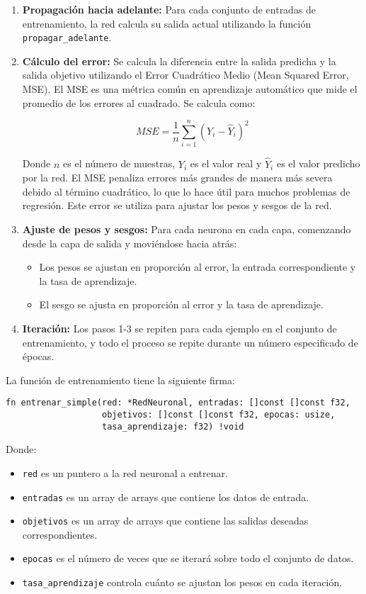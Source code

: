 \documentclass[twocolumn]{article}
\begin{document}
\begin{enumerate}
    \item \textbf{Propagación hacia adelante:} Para cada conjunto de entradas de entrenamiento, la red calcula su salida actual utilizando la función \texttt{propagar\_adelante}.

    \item \textbf{Cálculo del error:} Se calcula la diferencia entre la salida predicha y la salida objetivo utilizando el Error Cuadrático Medio (Mean Squared Error, MSE). El MSE es una métrica común en aprendizaje automático que mide el promedio de los errores al cuadrado. Se calcula como:
    
    \[
    MSE = \frac{1}{n} \sum_{i=1}^n (Y_i - \hat{Y}_i)^2
    \]
    
    Donde $n$ es el número de muestras, $Y_i$ es el valor real y $\hat{Y}_i$ es el valor predicho por la red. El MSE penaliza errores más grandes de manera más severa debido al término cuadrático, lo que lo hace útil para muchos problemas de regresión. Este error se utiliza para ajustar los pesos y sesgos de la red.
    
    \item \textbf{Ajuste de pesos y sesgos:} Para cada neurona en cada capa, comenzando desde la capa de salida y moviéndose hacia atrás:
    \begin{itemize}
        \item Los pesos se ajustan en proporción al error, la entrada correspondiente y la tasa de aprendizaje.
        \item El sesgo se ajusta en proporción al error y la tasa de aprendizaje.
    \end{itemize}

    \item \textbf{Iteración:} Los pasos 1-3 se repiten para cada ejemplo en el conjunto de entrenamiento, y todo el proceso se repite durante un número especificado de épocas.
\end{enumerate}

La función de entrenamiento tiene la siguiente firma:
\begin{lstlisting}[style=customcode]
fn entrenar_simple(red: *RedNeuronal, entradas: []const []const f32, 
                   objetivos: []const []const f32, epocas: usize, 
                   tasa_aprendizaje: f32) !void
\end{lstlisting}

Donde:
\begin{itemize}
    \item \texttt{red} es un puntero a la red neuronal a entrenar.
    \item \texttt{entradas} es un array de arrays que contiene los datos de entrada.
    \item \texttt{objetivos} es un array de arrays que contiene las salidas deseadas correspondientes.
    \item \texttt{epocas} es el número de veces que se iterará sobre todo el conjunto de datos.
    \item \texttt{tasa\_aprendizaje} controla cuánto se ajustan los pesos en cada iteración.
\end{itemize}
\end{document}
